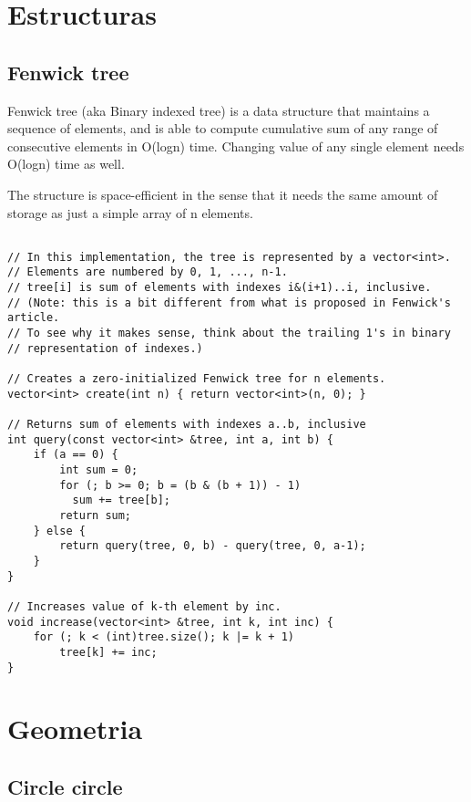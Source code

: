 \documentclass[a4paper, 11pt, oneside]{report}
\begin{document}
\chapter{Estructuras}

\section{Fenwick tree}

Fenwick tree (aka Binary indexed tree) is a data structure that maintains a sequence of elements, and is able to compute cumulative sum of any range of consecutive elements in O(logn) time. Changing value of any single element needs O(logn) time as well.

The structure is space-efficient in the sense that it needs the same amount of storage as just a simple array of n elements.

\begin{verbatim}

// In this implementation, the tree is represented by a vector<int>.
// Elements are numbered by 0, 1, ..., n-1.
// tree[i] is sum of elements with indexes i&(i+1)..i, inclusive.
// (Note: this is a bit different from what is proposed in Fenwick's article.
// To see why it makes sense, think about the trailing 1's in binary
// representation of indexes.)

// Creates a zero-initialized Fenwick tree for n elements.
vector<int> create(int n) { return vector<int>(n, 0); }

// Returns sum of elements with indexes a..b, inclusive
int query(const vector<int> &tree, int a, int b) {
    if (a == 0) {
        int sum = 0;
        for (; b >= 0; b = (b & (b + 1)) - 1)
          sum += tree[b];
        return sum;
    } else {
        return query(tree, 0, b) - query(tree, 0, a-1);
    }
}

// Increases value of k-th element by inc.
void increase(vector<int> &tree, int k, int inc) {
    for (; k < (int)tree.size(); k |= k + 1)
        tree[k] += inc;
}

\end{verbatim}

\chapter{Geometria}

\section{Circle circle}
\end{document}
